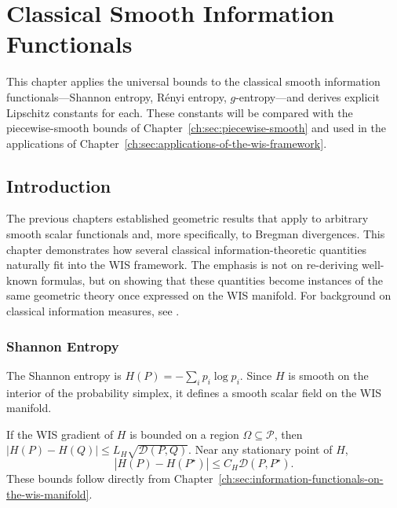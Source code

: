 \chapter[Classical Smooth Functionals]{Classical Smooth Information Functionals}\label{ch:sec:classical-smooth-information-functionals}

This chapter applies the universal bounds to the classical smooth information functionals---Shannon entropy, R\'enyi entropy, $g$-entropy---and derives explicit Lipschitz constants for each. These constants will be compared with the piecewise-smooth bounds of Chapter~\ref{ch:sec:piecewise-smooth} and used in the applications of Chapter~\ref{ch:sec:applications-of-the-wis-framework}.


\section{Introduction}\label{ch:sec:introduction-smooth_functionals}
The previous chapters established geometric results that apply to
arbitrary smooth scalar functionals and, more specifically, to Bregman
divergences. This chapter demonstrates how several classical
information-theoretic quantities naturally fit into the WIS framework.
The emphasis is not on re-deriving well-known formulas, but on showing
that these quantities become instances of the same geometric theory once
expressed on the WIS manifold.  For background on classical information
measures, see \cite{cichocki2010families, sason2016fdivergence, reid2011information}.
\subsection{Shannon Entropy}\label{ch:cor:16-1}
The Shannon entropy \cite{cover2012elements} is
\(H(P)=-\sum_i p_i\log p_i.\)
Since \(H\) is smooth on the interior of the probability simplex, it
defines a smooth scalar field on the WIS manifold.
\begin{corollary}

If the WIS gradient of \(H\) is bounded on a region
\(\Omega\subseteq\mathcal P\), then
$|H(P)-H(Q)| \le L_H\sqrt{\mathcal D(P,Q)}.$
Near any stationary point of \(H\),
\[ |H(P)-H(P^{\star})| \le
C_H\mathcal D(P,P^{\star}). \]
These bounds follow directly from Chapter~\ref{ch:sec:information-functionals-on-the-wis-manifold}.
\end{corollary}
